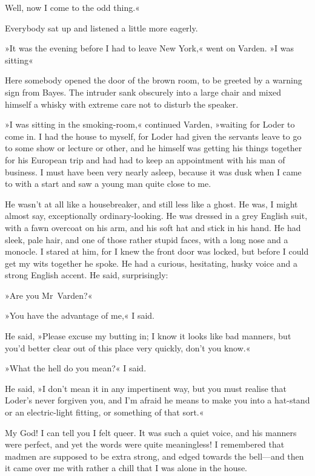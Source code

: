 Well, now I come to the odd thing.«

Everybody sat up and listened a little more eagerly.

»It was the evening before I had to leave New York,« went on Varden. »I was sitting\longdash«

Here somebody opened the door of the brown room, to be greeted by a warning sign from Bayes. The intruder sank obscurely into a large chair and mixed himself a whisky with extreme care not to disturb the speaker.

»I was sitting in the smoking-room,« continued Varden, »waiting for Loder to come in. I had the house to myself, for Loder had given the servants leave to go to some show or lecture or other, and he himself was getting his things together for his European trip and had had to keep an appointment with his man of business. I must have been very nearly asleep, because it was dusk when I came to with a start and saw a young man quite close to me.

He wasn't at all like a housebreaker, and still less like a ghost. He was, I might almost say, exceptionally ordinary-looking. He was dressed in a grey English suit, with a fawn overcoat on his arm, and his soft hat and stick in his hand. He had sleek, pale hair, and one of those rather stupid faces, with a long nose and a monocle. I stared at him, for I knew the front door was locked, but before I could get my wits together he spoke. He had a curious, hesitating, husky voice and a strong English accent. He said, surprisingly:

»Are you Mr~Varden?«

»You have the advantage of me,« I said.

He said, »Please excuse my butting in; I know it looks like bad manners, but you'd better clear out of this place very quickly, don't you know.«

»What the hell do you mean?« I said.

He said, »I don't mean it in any impertinent way, but you must realise that Loder's never forgiven you, and I'm afraid he means to make you into a hat-stand or an electric-light fitting, or something of that sort.«

My God! I can tell you I felt queer. It was such a quiet voice, and his manners were perfect, and yet the words were quite meaningless! I remembered that madmen are supposed to be extra strong, and edged towards the bell—and then it came over me with rather a chill that I was alone in the house.

